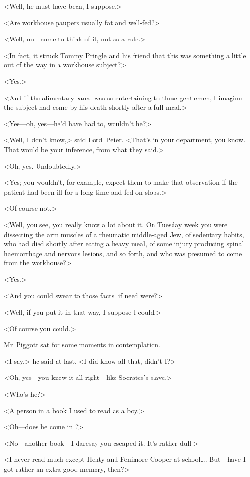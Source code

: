 <Well, he must have been, I suppose.>

<Are workhouse paupers usually fat and well-fed?>

<Well, no—come to think of it, not as a rule.>

<In fact, it struck Tommy Pringle and his friend that this was something a little out of the way in a workhouse subject?>

<Yes.>

<And if the alimentary canal was so entertaining to these gentlemen, I imagine the subject had come by his death shortly after a full meal.>

<Yes—oh, yes—he'd have had to, wouldn't he?>

<Well, I don't know,> said Lord~Peter. <That's in your department, you know. That would be your inference, from what they said.>

<Oh, yes. Undoubtedly.>

<Yes; you wouldn't, for example, expect them to make that observation if the patient had been ill for a long time and fed on slops.>

<Of course not.>

<Well, you see, you really know a lot about it. On Tuesday week you were dissecting the arm muscles of a rheumatic middle-aged Jew, of sedentary habits, who had died shortly after eating a heavy meal, of some injury producing spinal haemorrhage and nervous lesions, and so forth, and who was presumed to come from the workhouse?>

<Yes.>

<And you could swear to those facts, if need were?>

<Well, if you put it in that way, I suppose I could.>

<Of course you could.>

Mr~Piggott sat for some moments in contemplation.

<I say,> he said at last, <I did know all that, didn't I\@?>

<Oh, yes—you knew it all right—like Socrates's slave.>

<Who's he?>

<A person in a book I used to read as a boy.>

<Oh—does he come in ?>

<No—another book—I daresay you escaped it. It's rather dull.>

<I never read much except Henty and Fenimore Cooper at school\dots . But—have I got rather an extra good memory, then?>


